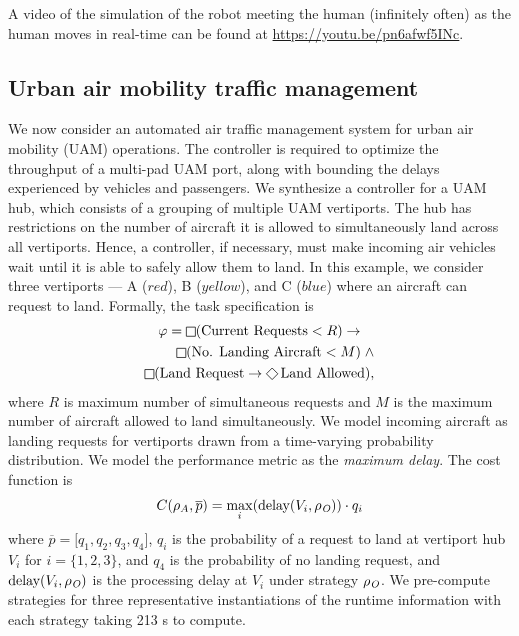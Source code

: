 A video of the simulation of the robot meeting the human (infinitely often) as the human moves in real-time can be found at \url{https://youtu.be/pn6afwf5INc}.

\subsection{Urban air mobility traffic management}

We now consider an automated air traffic management system for urban air mobility (UAM) operations. The controller is required to optimize the throughput of a multi-pad UAM port, along with bounding the delays experienced by vehicles and passengers. We synthesize a controller for a UAM hub, which consists of a grouping of multiple UAM vertiports. The hub has restrictions on the number of aircraft it is allowed to simultaneously land across all vertiports. Hence, a controller, if necessary, must make incoming air vehicles wait until it is able to safely allow them to land. In this example, we consider three vertiports --- A ($red$), B ($yellow$), and C ($blue$) where an aircraft can request to land. Formally, the task specification is
\vspace{-0.12cm}
\begin{multline*}
    \varphi = \LTLglobally (\text{Current Requests} < R) 
\rightarrow \\ \qquad\;\LTLglobally (\text{No. Landing Aircraft} < M) \; \wedge \\ \LTLglobally (\text{Land Request} \rightarrow \LTLfinally \text{Land Allowed}),
\end{multline*}
where $R$ is maximum number of simultaneous requests and $M$ is the maximum number of aircraft allowed to land simultaneously. We model incoming aircraft as landing requests for vertiports drawn from a time-varying probability distribution. We model the performance metric as the \emph{maximum delay}. The cost function is
\begin{align}
C(\rho_A,\overline{p}) = \max_i(\text{delay}(V_i,\rho_{\textit{O}}))\cdot q_i\label{eq:cost_UAM}
\end{align}
where $\overline{p} = \lbrack q_1 , q_2,q_3,q_4 \rbrack$, $q_i$ is the probability of a request to land at vertiport hub $V_i$ for $i=\{1,2,3\}$, and $q_4$ is the probability of no landing request, and $\text{delay}(V_i,\rho_{\textit{O}})$ is the processing delay at $V_i$ under strategy $\rho_{\textit{O}}$. We pre-compute strategies for three representative instantiations of the runtime information with each strategy taking 213 s to compute.
